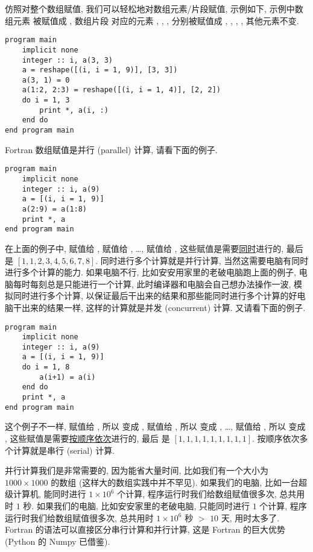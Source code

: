 仿照对整个数组赋值, 我们可以轻松地对数组元素/片段赋值, 示例如下, 示例中数组元素  被赋值成 , 数组片段  对应的元素 , , ,  分别被赋值成 , , , , 其他元素不变. 
\begin{lstlisting}
program main
    implicit none
    integer :: i, a(3, 3)
    a = reshape([(i, i = 1, 9)], [3, 3])
    a(3, 1) = 0
    a(1:2, 2:3) = reshape([(i, i = 1, 4)], [2, 2])
    do i = 1, 3
        print *, a(i, :)
    end do
end program main
\end{lstlisting}

Fortran 数组赋值是并行 (parallel) 计算, 请看下面的例子.
\begin{lstlisting}
program main
    implicit none
    integer :: i, a(9)
    a = [(i, i = 1, 9)]
    a(2:9) = a(1:8)
    print *, a
end program main
\end{lstlisting}
在上面的例子中,  赋值给 ,  赋值给 , \dots{},  赋值给 , 这些赋值是需要\uline{同时}进行的, 最后  是 $[1,1,2,3,4,5,6,7,8]$. 同时进行多个计算就是并行计算, 当然这需要电脑有同时进行多个计算的能力. 如果电脑不行, 比如安安用家里的老破电脑跑上面的例子, 电脑每时每刻总是只能进行一个计算, 此时编译器和电脑会自己想办法操作一波, 模拟同时进行多个计算, 以保证最后干出来的结果和那些能同时进行多个计算的好电脑干出来的结果一样, 这样的计算就是并发 (concurrent) 计算. 又请看下面的例子.
\begin{lstlisting}
program main
    implicit none
    integer :: i, a(9)
    a = [(i, i = 1, 9)]
    do i = 1, 8
        a(i+1) = a(i)
    end do
    print *, a
end program main
\end{lstlisting}
这个例子不一样,  赋值给 , 所以  变成 ,  赋值给 , 所以  变成 , \dots{},  赋值给 , 所以  变成 , 这些赋值是需要\uline{按顺序依次}进行的, 最后  是 $[1,1,1,1,1,1,1,1,1]$. 按顺序依次多个计算就是串行 (serial) 计算.

并行计算我们是非常需要的, 因为能省大量时间, 比如我们有一个大小为 $1000\times1000$ 的数组 (这样大的数组实践中并不罕见). 如果我们的电脑, 比如一台超级计算机, 能同时进行 $1\times{10}^6$ 个计算, 程序运行时我们给数组赋值很多次, 总共用时 $1$ 秒. 如果我们的电脑, 比如安安家里的老破电脑, 只能同时进行 $1$ 个计算, 程序运行时我们给数组赋值很多次, 总共用时 $1\times{10}^6$ 秒 $>$ $10$ 天, 用时太多了. Fortran 的语法可以直接区分串行计算和并行计算, 这是 Fortran 的巨大优势 (Python 的 Numpy 已借鉴).

